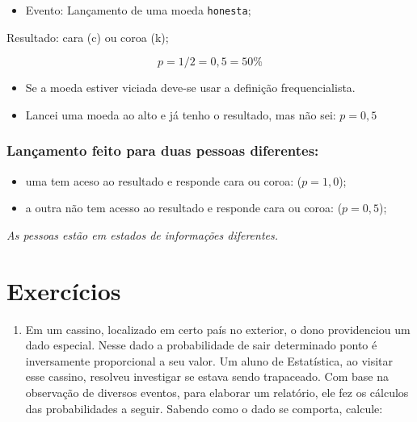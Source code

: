 \documentclass[
]{book}
\providecommand{\tightlist}{%
  \setlength{\itemsep}{0pt}\setlength{\parskip}{0pt}}
\begin{document}
\begin{itemize}
\tightlist
\item
  Evento: Lançamento de uma moeda \texttt{honesta};
\end{itemize}

Resultado: cara (c) ou coroa (k);

\[p=1/2=0,5 = 50\%\]

\begin{itemize}
\item
  Se a moeda estiver viciada deve-se usar a definição frequencialista.
\item
  Lancei uma moeda ao alto e já tenho o resultado, mas não sei: \(p=0,5\)
\end{itemize}

\hypertarget{lanuxe7amento-feito-para-duas-pessoas-diferentes}{%
\subsubsection*{Lançamento feito para duas pessoas diferentes:}\label{lanuxe7amento-feito-para-duas-pessoas-diferentes}}

\begin{itemize}
\item
  uma tem aceso ao resultado e responde cara ou coroa: (\(p=1,0\));
\item
  a outra não tem acesso ao resultado e responde cara ou coroa: (\(p=0,5\));
\end{itemize}

\emph{As pessoas estão em estados de informações diferentes.}

\hypertarget{exercuxedcios}{%
\section{Exercícios}\label{exercuxedcios}}

\begin{enumerate}
\def\labelenumi{\arabic{enumi})}
\tightlist
\item
  Em um cassino, localizado em certo país no exterior, o dono providenciou um dado especial. Nesse dado a probabilidade de sair determinado ponto é inversamente proporcional a seu valor.
  Um aluno de Estatística, ao visitar esse cassino, resolveu investigar se estava sendo trapaceado. Com base na observação de diversos eventos, para elaborar um relatório, ele fez os cálculos das probabilidades a seguir.
  Sabendo como o dado se comporta, calcule:
\end{enumerate}
\end{document}
